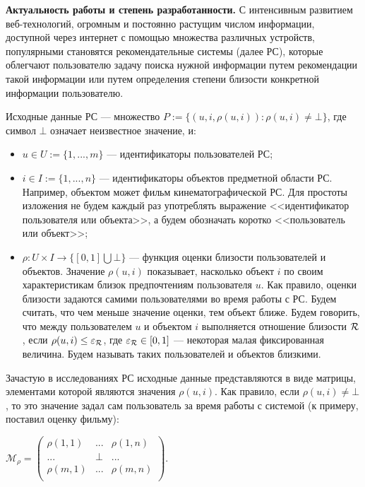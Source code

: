 
{\bf Актуальность работы и степень разработанности.}
С интенсивным развитием веб-технологий, огромным и постоянно растущим числом
информации, доступной через интернет с помощью множества различных устройств,
популярными становятся рекомендательные системы (далее РС), которые облегчают
пользователю задачу поиска нужной информации путем рекомендации такой информации
или путем определения степени близости конкретной информации пользователю.

Исходные данные РС --- множество
$P := \{(u, i, \rho(u, i)): \rho(u, i) \ne \bot\}$,
где символ $\bot$ означает неизвестное значение, и:
\begin{itemize}
	\item $u \in U := \{1,...,m\}$ --- идентификаторы пользователей РС;

	\item $i \in I := \{1,...,n\}$ --- идентификаторы объектов предметной
области РС. Например, объектом может фильм кинематографической РС.
Для простоты изложения не будем каждый раз употреблять выражение
<<идентификатор пользователя или объекта>>, а будем обозначать коротко
<<пользователь или объект>>;

	\item $\rho: U \times I \rightarrow \{[0,1] \bigcup \bot\}$ --- функция оценки близости
		пользователей и объектов. Значение $\rho(u,i)$ показывает, насколько
		объект $i$ по своим характеристикам близок предпочтениям пользователя $u$.
		Как правило, оценки близости задаются самими пользователями во время
		работы с РС.
		Будем считать, что чем меньше значение оценки, тем объект ближе.
		Будем говорить, что между пользователем $u$ и
		объектом $i$ выполняется отношение близости $\mathcal{R}$, если
		$\rho(u, i) \le \varepsilon_{\mathcal{R}}$, где $\varepsilon_{\mathcal{R}} \in [0,1]$ --- некоторая
		малая фиксированная величина.
		Будем называть таких пользователей и объектов близкими.
	\end{itemize}

Зачастую в исследованиях РС исходные данные
представляются в виде матрицы, элементами которой являются
значения $\rho(u, i)$. Как правило, если $\rho(u, i) \ne \bot$,
то это значение задал сам пользователь за время работы с системой
(к примеру, поставил оценку фильму):

\begin{center}
$\mathcal{M}_{\rho} =
\begin{pmatrix}
	\rho(1,1)& ... & \rho(1,n)  \\
	...      & \bot & ...  \\
	\rho(m,1)& ... & \rho(m,n)  \\
\end{pmatrix}$.\\
\end{center}


